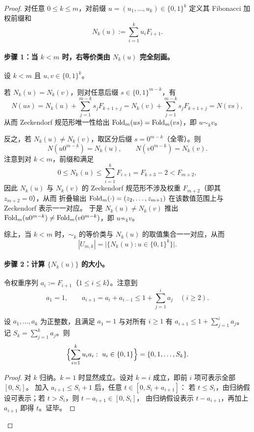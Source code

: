 \begin{proof}
对任意 $0\le k\le m$，对前缀 $u=(u_1,\dots,u_k)\in\{0,1\}^k$ 定义其 Fibonacci 加权前缀和
\[
N_k(u):=\sum_{i=1}^{k} u_i F_{i+1}.
\]

\paragraph{步骤 1：当 $k<m$ 时，右等价类由 $N_k(u)$ 完全刻画。}
设 $k<m$ 且 $u,v\in\{0,1\}^k$。

若 $N_k(u)=N_k(v)$，则对任意后缀 $s\in\{0,1\}^{m-k}$，有
\[
N(us)=N_k(u)+\sum_{j=1}^{m-k} s_j F_{k+1+j}
=N_k(v)+\sum_{j=1}^{m-k} s_j F_{k+1+j}=N(vs),
\]
从而 Zeckendorf 规范形唯一性给出 $\mathrm{Fold}_m(us)=\mathrm{Fold}_m(vs)$，即 $u\sim_k v$。

反之，若 $N_k(u)\ne N_k(v)$，取区分后缀 $s=0^{m-k}$（全零）。则
\[
N(u0^{m-k})=N_k(u),\qquad N(v0^{m-k})=N_k(v).
\]
注意到对 $k<m$，前缀和满足
\[
0\le N_k(u)\le \sum_{i=1}^{k} F_{i+1}=F_{k+3}-2<F_{m+2},
\]
因此 $N_k(u)$ 与 $N_k(v)$ 的 Zeckendorf 规范形不涉及权重 $F_{m+2}$（即其 $z_{m+2}=0$），从而
折叠输出 $\mathrm{Fold}_m(\cdot)=(z_2,\dots,z_{m+1})$ 在该数值范围上与 Zeckendorf 表示一一对应。
于是 $N_k(u)\ne N_k(v)$ 推出 $\mathrm{Fold}_m(u0^{m-k})\ne \mathrm{Fold}_m(v0^{m-k})$，即 $u\not\sim_k v$。

综上，当 $k<m$ 时，$\sim_k$ 的等价类与 $N_k(u)$ 的取值集合一一对应，从而
\[
|U_{m,k}|=\bigl|\{N_k(u):u\in\{0,1\}^k\}\bigr|.
\]

\paragraph{步骤 2：计算 $\{N_k(u)\}$ 的大小。}
令权重序列 $a_i:=F_{i+1}$（$1\le i\le k$）。注意到
\[
a_1=1,\qquad a_{i+1}=a_i+a_{i-1}\le 1+\sum_{j=1}^{i} a_j\quad(i\ge 2).
\]
\begin{lemma}[区间覆盖的子集和]\label{lem:subset_sum_interval}
设 $a_1,\dots,a_k$ 为正整数，且满足 $a_1=1$ 与对所有 $i\ge 1$ 有 $a_{i+1}\le 1+\sum_{j=1}^{i} a_j$。
记 $S_k=\sum_{j=1}^{k} a_j$。则
\[
\Bigl\{\sum_{i=1}^k u_i a_i:\ u_i\in\{0,1\}\Bigr\}=\{0,1,\dots,S_k\}.
\]
\end{lemma}
\begin{proof}
对 $k$ 归纳。$k=1$ 时显然成立。设对 $k=i$ 成立，即前 $i$ 项可表示全部 $[0,S_i]$。
加入 $a_{i+1}\le S_i+1$ 后，任意 $t\in[0,S_i+a_{i+1}]$：
若 $t\le S_i$，由归纳假设可表示；若 $t>S_i$，则 $t-a_{i+1}\in[0,S_i]$，
由归纳假设表示 $t-a_{i+1}$，再加上 $a_{i+1}$ 即得 $t$。证毕。
\end{proof}


\end{proof}
